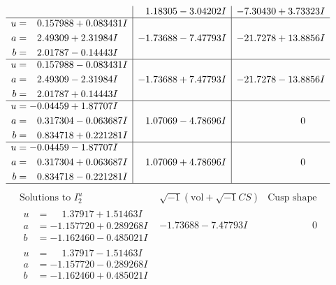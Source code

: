 \documentclass[1p]{elsarticle_modified}
\theoremstyle{definition}
\newcommand{\I}{\sqrt{-1}}
\begin{document}
$$\begin{array}{c|c|c}
 & \phantom{-}1.18305 - 3.04202 I & -7.30430 + 3.73323 I \\ \hline\begin{aligned}
u &= \phantom{-}0.157988 + 0.083431 I \\
a &= \phantom{-}2.49309 + 2.31984 I \\
b &= \phantom{-}2.01787 - 0.14443 I\end{aligned}
 & -1.73688 - 7.47793 I & -21.7278 + 13.8856 I \\ \hline\begin{aligned}
u &= \phantom{-}0.157988 - 0.083431 I \\
a &= \phantom{-}2.49309 - 2.31984 I \\
b &= \phantom{-}2.01787 + 0.14443 I\end{aligned}
 & -1.73688 + 7.47793 I & -21.7278 - 13.8856 I \\ \hline\begin{aligned}
u &= -0.04459 + 1.87707 I \\
a &= \phantom{-}0.317304 - 0.063687 I \\
b &= \phantom{-}0.834718 + 0.221281 I\end{aligned}
 & \phantom{-}1.07069 - 4.78696 I & \phantom{-0.000000 } 0 \\ \hline\begin{aligned}
u &= -0.04459 - 1.87707 I \\
a &= \phantom{-}0.317304 + 0.063687 I \\
b &= \phantom{-}0.834718 - 0.221281 I\end{aligned}
 & \phantom{-}1.07069 + 4.78696 I & \phantom{-0.000000 } 0\\
 \hline 
 \end{array}$$\newpage$$\begin{array}{c|c|c}  
\text{Solutions to }I^u_{2}& \I (\text{vol} + \sqrt{-1}CS) & \text{Cusp shape}\\
 \hline 
\begin{aligned}
u &= \phantom{-}1.37917 + 1.51463 I \\
a &= -1.157720 + 0.289268 I \\
b &= -1.162460 - 0.485021 I\end{aligned}
 & -1.73688 - 7.47793 I & \phantom{-0.000000 } 0 \\ \hline\begin{aligned}
u &= \phantom{-}1.37917 - 1.51463 I \\
a &= -1.157720 - 0.289268 I \\
b &= -1.162460 + 0.485021 I\end{aligned}

\end{array}$$
\end{document}
